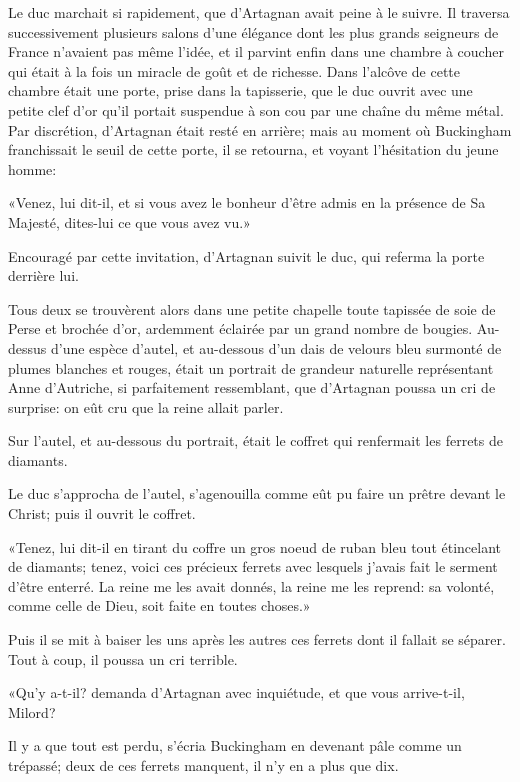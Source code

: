 Le duc marchait si rapidement, que d'Artagnan avait peine à le suivre. Il traversa successivement plusieurs salons d'une élégance dont les plus grands seigneurs de France n'avaient pas même l'idée, et il parvint enfin dans une chambre à coucher qui était à la fois un miracle de goût et de richesse. Dans l'alcôve de cette chambre était une porte, prise dans la tapisserie, que le duc ouvrit avec une petite clef d'or qu'il portait suspendue à son cou par une chaîne du même métal. Par discrétion, d'Artagnan était resté en arrière; mais au moment où Buckingham franchissait le seuil de cette porte, il se retourna, et voyant l'hésitation du jeune homme: 

«Venez, lui dit-il, et si vous avez le bonheur d'être admis en la présence de Sa Majesté, dites-lui ce que vous avez vu.» 

Encouragé par cette invitation, d'Artagnan suivit le duc, qui referma la porte derrière lui. 

Tous deux se trouvèrent alors dans une petite chapelle toute tapissée de soie de Perse et brochée d'or, ardemment éclairée par un grand nombre de bougies. Au-dessus d'une espèce d'autel, et au-dessous d'un dais de velours bleu surmonté de plumes blanches et rouges, était un portrait de grandeur naturelle représentant Anne d'Autriche, si parfaitement ressemblant, que d'Artagnan poussa un cri de surprise: on eût cru que la reine allait parler. 

Sur l'autel, et au-dessous du portrait, était le coffret qui renfermait les ferrets de diamants. 

Le duc s'approcha de l'autel, s'agenouilla comme eût pu faire un prêtre devant le Christ; puis il ouvrit le coffret. 

«Tenez, lui dit-il en tirant du coffre un gros noeud de ruban bleu tout étincelant de diamants; tenez, voici ces précieux ferrets avec lesquels j'avais fait le serment d'être enterré. La reine me les avait donnés, la reine me les reprend: sa volonté, comme celle de Dieu, soit faite en toutes choses.» 

Puis il se mit à baiser les uns après les autres ces ferrets dont il fallait se séparer. Tout à coup, il poussa un cri terrible. 

«Qu'y a-t-il? demanda d'Artagnan avec inquiétude, et que vous arrive-t-il, Milord? 

\speak  Il y a que tout est perdu, s'écria Buckingham en devenant pâle comme un trépassé; deux de ces ferrets manquent, il n'y en a plus que dix. 

